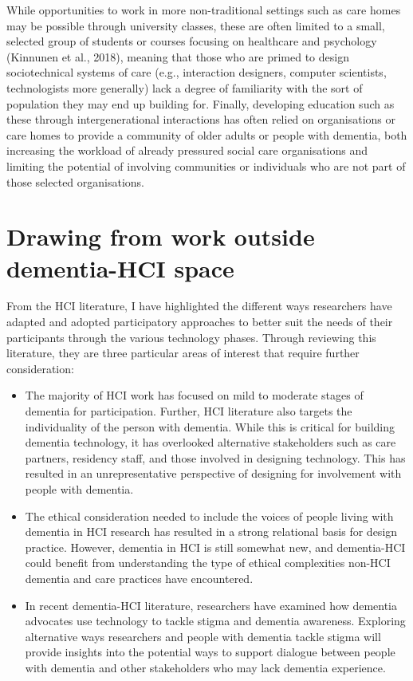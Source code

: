 While opportunities to work in more non-traditional settings such as care homes may be possible through university classes, these are often limited to a small, selected group of students or courses focusing on healthcare and psychology (Kinnunen et al., 2018), meaning that those who are primed to design sociotechnical systems of care (e.g., interaction designers, computer scientists, technologists more generally) lack a degree of familiarity with the sort of population they may end up building for. Finally, developing education such as these through intergenerational interactions has often relied on organisations or care homes to provide a community of older adults or people with dementia, both increasing the workload of already pressured social care organisations and limiting the potential of involving communities or individuals who are not part of those selected organisations. 

\section{Drawing from work outside dementia-HCI space}
\label{BL:Outside-HCI}
From the HCI literature, I have highlighted the different ways researchers have adapted and adopted participatory approaches to better suit the needs of their participants through the various technology phases. Through reviewing this literature, they are three particular areas of interest that require further consideration:
\begin{itemize}
    \item The majority of HCI work has focused on mild to moderate stages of dementia for participation. Further, HCI literature also targets the individuality of the person with dementia. While this is critical for building dementia technology, it has overlooked alternative stakeholders such as care partners, residency staff, and those involved in designing technology. This has resulted in an unrepresentative perspective of designing for involvement with people with dementia. 
    
    \item The ethical consideration needed to include the voices of people living with dementia in HCI research has resulted in a strong relational basis for design practice. However, dementia in HCI is still somewhat new, and dementia-HCI could benefit from understanding the type of ethical complexities non-HCI dementia and care practices have encountered.
    
    \item In recent dementia-HCI literature, researchers have examined how dementia advocates use technology to tackle stigma and dementia awareness. Exploring alternative ways researchers and people with dementia tackle stigma will provide insights into the potential ways to support dialogue between people with dementia and other stakeholders who may lack dementia experience.
\end{itemize}

